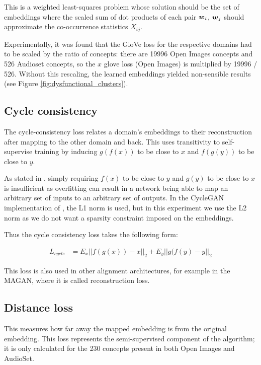 This is a weighted least-squares problem whose solution should be the set of embeddings where the scaled sum of dot products of each pair $\boldsymbol{w}_i$, $\boldsymbol{w}_j$ should approximate the co-occurrence statistics $X_{ij}$. 

Experimentally, it was found that the GloVe loss for the respective domains had to be scaled by the ratio of concepts: there are 19996 Open Images concepts and 526 Audioset concepts, so the $x$ glove loss (Open Images) is multiplied by 19996 / 526. Without this rescaling, the learned embeddings yielded non-sensible results (see Figure \ref{fig:dysfunctional_clusters}). 

\subsection{Cycle consistency}

The cycle-consistency loss relates a domain's embeddings to their reconstruction after mapping to the other domain and back. This uses transitivity to self-supervise training by inducing $g(f(x))$ to be close to $x$ and $f(g(y))$ to be close to $y$. 

As stated in \cite{CycleGAN}, simply requiring $f(x)$ to be close to $y$ and $g(y)$ to be close to $x$ is insufficient as overfitting can result in a network being able to map an arbitrary set of inputs to an arbitrary set of outputs. In the CycleGAN implementation of \cite{CycleGAN}, the L1 norm is used, but in this experiment we use the L2 norm as we do not want a sparsity constraint imposed on the embeddings. 

Thus the cycle consistency loss takes the following form:

\begin{equation*}
\begin{split}
L_{cycle} &= E_x ||f(g(x)) - x||_2 + E_y ||g(f(y) - y||_2
\end{split}
\end{equation*}

This loss is also used in other alignment architectures, for example in the MAGAN, \cite{magan} where it is called reconstruction loss. 

\subsection{Distance loss}

This measures how far away the mapped embedding is from the original embedding. This loss represents the semi-supervised component of the algorithm; it is only calculated for the 230 concepts present in both Open Images and AudioSet.

